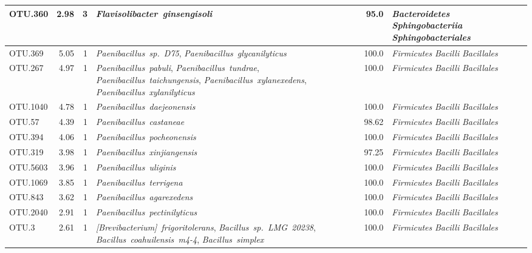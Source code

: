 \begin{ThreePartTable}
\begin{longtable}{lrrP{5cm}rP{5cm}}
OTU.360 & 2.98 & 3 & \mbox{\textit{Flavisolibacter ginsengisoli}} & 95.0 & \mbox{\textit{Bacteroidetes}} \mbox{\textit{Sphingobacteriia}} \mbox{\textit{Sphingobacteriales}} \\ \midrule
OTU.369 & 5.05 & 1 & \mbox{\textit{Paenibacillus sp. D75}}, \mbox{\textit{Paenibacillus glycanilyticus}} & 100.0 & \mbox{\textit{Firmicutes}} \mbox{\textit{Bacilli}} \mbox{\textit{Bacillales}} \\ \midrule
OTU.267 & 4.97 & 1 & \mbox{\textit{Paenibacillus pabuli}}, \mbox{\textit{Paenibacillus tundrae}}, \mbox{\textit{Paenibacillus taichungensis}}, \mbox{\textit{Paenibacillus xylanexedens}}, \mbox{\textit{Paenibacillus xylanilyticus}} & 100.0 & \mbox{\textit{Firmicutes}} \mbox{\textit{Bacilli}} \mbox{\textit{Bacillales}} \\ \midrule
OTU.1040 & 4.78 & 1 & \mbox{\textit{Paenibacillus daejeonensis}} & 100.0 & \mbox{\textit{Firmicutes}} \mbox{\textit{Bacilli}} \mbox{\textit{Bacillales}} \\ \midrule
OTU.57 & 4.39 & 1 & \mbox{\textit{Paenibacillus castaneae}} & 98.62 & \mbox{\textit{Firmicutes}} \mbox{\textit{Bacilli}} \mbox{\textit{Bacillales}} \\ \midrule
OTU.394 & 4.06 & 1 & \mbox{\textit{Paenibacillus pocheonensis}} & 100.0 & \mbox{\textit{Firmicutes}} \mbox{\textit{Bacilli}} \mbox{\textit{Bacillales}} \\ \midrule
OTU.319 & 3.98 & 1 & \mbox{\textit{Paenibacillus xinjiangensis}} & 97.25 & \mbox{\textit{Firmicutes}} \mbox{\textit{Bacilli}} \mbox{\textit{Bacillales}} \\ \midrule
OTU.5603 & 3.96 & 1 & \mbox{\textit{Paenibacillus uliginis}} & 100.0 & \mbox{\textit{Firmicutes}} \mbox{\textit{Bacilli}} \mbox{\textit{Bacillales}} \\ \midrule
OTU.1069 & 3.85 & 1 & \mbox{\textit{Paenibacillus terrigena}} & 100.0 & \mbox{\textit{Firmicutes}} \mbox{\textit{Bacilli}} \mbox{\textit{Bacillales}} \\ \midrule
OTU.843 & 3.62 & 1 & \mbox{\textit{Paenibacillus agarexedens}} & 100.0 & \mbox{\textit{Firmicutes}} \mbox{\textit{Bacilli}} \mbox{\textit{Bacillales}} \\ \midrule
OTU.2040 & 2.91 & 1 & \mbox{\textit{Paenibacillus pectinilyticus}} & 100.0 & \mbox{\textit{Firmicutes}} \mbox{\textit{Bacilli}} \mbox{\textit{Bacillales}} \\ \midrule
OTU.3 & 2.61 & 1 & \mbox{\textit{[Brevibacterium] frigoritolerans}}, \mbox{\textit{Bacillus sp. LMG 20238}}, \mbox{\textit{Bacillus coahuilensis m4-4}}, \mbox{\textit{Bacillus simplex}} & 100.0 & \mbox{\textit{Firmicutes}} \mbox{\textit{Bacilli}} \mbox{\textit{Bacillales}} \\ \midrule

\end{longtable}
\end{ThreePartTable}
